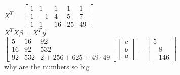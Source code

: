 \documentclass[leqno]{article}
\begin{document}
\begin{enumerate}
\begin{enumerate}
        $X^T = \begin{bmatrix}1 & 1 & 1 & 1 & 1 \\ 1 & -1 & 4 & 5 & 7 \\ 1 & 1 & 16 & 25 & 49\end{bmatrix}$\\
        $X^TX\beta = X^T\Vec y$\\
        $\begin{bmatrix}5 & 16 & 92 \\ 16 & 92 & 532\\ 92 & 532 & 2 + 256 + 625 + 49 \cdot 49\end{bmatrix}\begin{bmatrix}c \\ b \\ a\end{bmatrix} = \begin{bmatrix}5 \\ -8 \\ -146\end{bmatrix}$\\
        why are the numbers so big
    \end{enumerate}
\end{enumerate}
\end{document}
